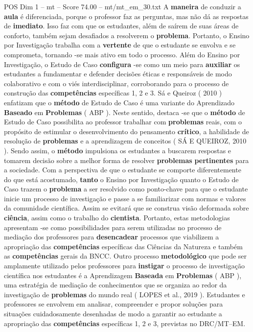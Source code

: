 \begin{textsample}{POS Dim 1 – mt – Score 74.00 – mt/mt\_em\_30.txt}
A \textbf{maneira} de conduzir a \textbf{aula} é diferenciada, porque o professor faz as perguntas, mas não dá as respostas de \textbf{imediato}.
Isso faz com que os estudantes, além de saírem de suas áreas de conforto, também sejam desafiados a resolverem o \textbf{problema}.
Portanto, o Ensino por Investigação trabalha com a \textbf{vertente} de que o estudante se envolva e se comprometa, tornando -se mais ativo em todo o processo.
Além do Ensino por Investigação, o Estudo de Caso \textbf{configura} -se como um meio para \textbf{auxiliar} os estudantes a fundamentar e defender decisões éticas e responsáveis de modo colaborativo e com o viés interdisciplinar, corroborando para o processo de construção das \textbf{competências} específicas 1, 2 e 3.
Sá e Queiroz ( 2010 ) enfatizam que o \textbf{método} de Estudo de Caso é uma variante do Aprendizado \textbf{Baseado} em \textbf{Problemas} ( ABP ).
Neste sentido, destaca -se que o \textbf{método} de Estudo de Caso possibilita ao professor trabalhar com \textbf{problemas} reais, com o propósito de estimular o desenvolvimento do pensamento \textbf{crítico}, a habilidade de resolução de \textbf{problemas} e a aprendizagem de conceitos ( SÁ E QUEIROZ, 2010 ).
Sendo assim, o \textbf{método} impulsiona os estudantes a buscarem respostas e tomarem decisão sobre a melhor forma de resolver \textbf{problemas} \textbf{pertinentes} para a sociedade.
Com a perspectiva de que o estudante se comporte diferentemente do que está acostumado, \textbf{tanto} o Ensino por Investigação quanto o Estudo de Caso trazem o \textbf{problema} a ser resolvido como ponto-chave para que o estudante inicie um processo de investigação e passe a se familiarizar com normas e valores da comunidade científica.
Assim se evitará que se construa visão deformada sobre \textbf{ciência}, assim como o trabalho do \textbf{cientista}.
Portanto, estas metodologias apresentam -se como possibilidades para serem utilizadas no processo de mediação dos professores para \textbf{desencadear} processos que viabilizem a apropriação das \textbf{competências} específicas das Ciências da Natureza e também as \textbf{competências} gerais da BNCC.
Outro processo \textbf{metodológico} que pode ser amplamente utilizado pelos professores para \textbf{instigar} o processo de investigação científica nos estudantes é a Aprendizagem \textbf{Baseada} em \textbf{Problemas} ( ABP ), uma estratégia de mediação de conhecimentos que se organiza ao redor da investigação de \textbf{problemas} do mundo real ( LOPES et al., 2019 ).
Estudantes e professores se envolvem em analisar, compreender e propor soluções para situações cuidadosamente desenhadas de modo a garantir ao estudante a apropriação das \textbf{competências} específicas 1, 2 e 3, previstas no DRC/MT–EM.

\end{textsample}
